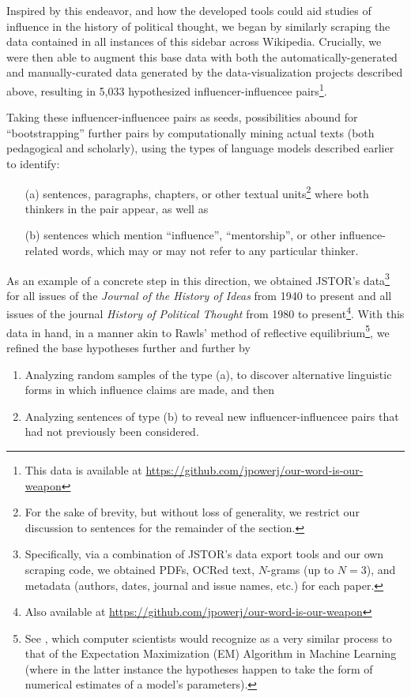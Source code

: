 \documentclass[11pt]{article}
\begin{document}
Inspired by this endeavor, and how the developed tools could aid studies of influence in the history of political thought, we began by similarly scraping the data contained in all instances of this sidebar across Wikipedia. Crucially, we were then able to augment this base data with both the automatically-generated and manually-curated data generated by the data-visualization projects described above, resulting in 5,033 hypothesized influencer-influencee pairs\footnote{This data is available at \href{https://github.com/jpowerj/our-word-is-our-weapon}{https://github.com/jpowerj/our-word-is-our-weapon}}.

Taking these influencer-influencee pairs as seeds, possibilities abound for ``bootstrapping'' further pairs by computationally mining actual texts (both pedagogical and scholarly), using the types of language models described earlier to identify:
\begin{enumerate}
	\item[(a)] sentences, paragraphs, chapters, or other textual units\footnote{For the sake of brevity, but without loss of generality, we restrict our discussion to sentences for the remainder of the section.} where both thinkers in the pair appear, as well as
	\item[(b)] sentences which mention ``influence'', ``mentorship'', or other influence-related words, which may or may not refer to any particular thinker.
\end{enumerate}

As an example of a concrete step in this direction, we obtained JSTOR's data\footnote{Specifically, via a combination of JSTOR's data export tools and our own scraping code, we obtained PDFs, OCRed text, $N$-grams (up to $N=3$), and metadata (authors, dates, journal and issue names, etc.) for each paper.} for all issues of the \textit{Journal of the History of Ideas} from 1940 to present and all issues of the journal \textit{History of Political Thought} from 1980 to present\footnote{Also available at \href{https://github.com/jpowerj/our-word-is-our-weapon}{https://github.com/jpowerj/our-word-is-our-weapon}}. With this data in hand, in a manner akin to Rawls' method of reflective equilibrium\footnote{See \cite{rawls_outline_1951}, which computer scientists would recognize as a very similar process to that of the Expectation Maximization (EM) Algorithm in Machine Learning (where in the latter instance the hypotheses happen to take the form of numerical estimates of a model's parameters).}, we refined the base hypotheses further and further by
\begin{enumerate}
	\item Analyzing random samples of the type (a), to discover alternative linguistic forms in which influence claims are made, and then
	\item Analyzing sentences of type (b) to reveal new influencer-influencee pairs that had not previously been considered.
\end{enumerate}
\end{document}
